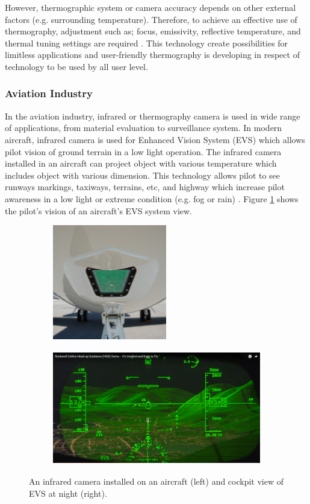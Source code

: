 \noindent However, thermographic system or camera accuracy depends on other external factors (e.g. surrounding temperature). Therefore, to achieve an effective use of thermography, adjustment such as; focus, emissivity, reflective temperature, and thermal tuning settings are required \cite{TroutInfraredPlant}. This technology create possibilities for limitless applications and user-friendly thermography is developing in respect of technology to be used by all user level.\\

\subsubsection{Aviation Industry}
In the aviation industry, infrared or thermography camera is used in wide range of applications, from material evaluation to surveillance system. In modern aircraft, infrared camera is used for Enhanced Vision System (EVS) which allows pilot vision of ground terrain in a low light operation. The infrared camera installed in an aircraft can project object with various temperature which includes object with various dimension. This technology allows pilot to see runways markings, taxiways, terrains, etc, and highway which increase pilot awareness in a low light or extreme condition (e.g. fog or rain) \cite{Stumper2015ThermalAviation}. Figure \ref{fig:EVS system} shows the pilot's vision of an aircraft's EVS system view.  \\

\begin{figure}[!ht]
\centering
%    
  \begin{subfigure}[b]{0.35\textwidth}
    \includegraphics[height=5cm]{Figures/IR_IR camera install.jpg}
  \end{subfigure}
  \begin{subfigure}[b]{0.6\textwidth}
    \includegraphics[height=5cm]{Figures/IR_EVS view.png}
  \end{subfigure}
%  
  \caption{An infrared camera installed on an aircraft \cite{AnonymousEnhancedWikipedia} (left) and cockpit view of EVS at night \cite{FehrmBjornsAnalysis} (right).}
    \label{fig:EVS system}
\end{figure}

